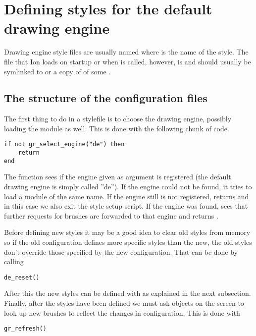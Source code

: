 \section{Defining styles for the default drawing engine}
\label{sec:defaultde}

Drawing engine style files are usually named
 where  is the name of the
style. The file that Ion loads on startup or when
 is called, however, is 
and should usually be symlinked to or a copy of of some
.

\subsection{The structure of the configuration files}

The first thing to do in a stylefile is to choose the drawing
engine, possibly loading the module as well. This is done
with the following chunk of code.

\begin{verbatim}
if not gr_select_engine("de") then 
    return 
end
\end{verbatim}

The  function sees if the engine
given as argument is registered (the default drawing engine is
simply called ''de''). If the engine could not be found, it
tries to load a module of the same name. If the engine still
is not registered,  returns 
and in this case we also exit the style setup script.
If the engine was found,  sees that
further requests for brushes are forwarded to that engine
and returns .

Before defining new styles it may be a good idea to clear old
styles from memory so if the old configuration defines more
specific styles than the new, the old styles don't override 
those specified by the new configuration. That can be done by
calling

\begin{verbatim}
de_reset()
\end{verbatim}

After this the new styles can be defined with 
as explained in the next subsection. Finally, after the styles have
been defined we must ask objects on the screen to look up new brushes
to reflect the changes in configuration. This is done with

\begin{verbatim}
gr_refresh()
\end{verbatim}


